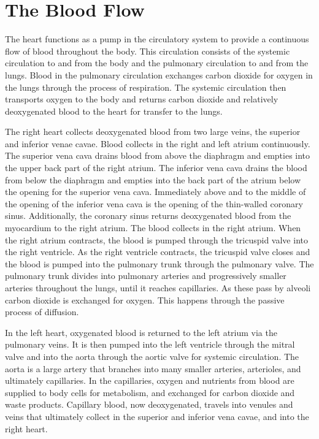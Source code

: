 \hypertarget{the-blood-flow}{%
\section{The Blood Flow}\label{the-blood-flow}}

The heart functions as a pump in the circulatory system to provide a continuous flow of blood throughout the body. This circulation consists of the systemic circulation to and from the body and the pulmonary circulation to and from the lungs. Blood in the pulmonary circulation exchanges carbon dioxide for oxygen in the lungs through the process of respiration. The systemic circulation then transports oxygen to the body and returns carbon dioxide and relatively deoxygenated blood to the heart for transfer to the lungs.

The right heart collects deoxygenated blood from two large veins, the superior and inferior venae cavae. Blood collects in the right and left atrium continuously. The superior vena cava drains blood from above the diaphragm and empties into the upper back part of the right atrium. The inferior vena cava drains the blood from below the diaphragm and empties into the back part of the atrium below the opening for the superior vena cava. Immediately above and to the middle of the opening of the inferior vena cava is the opening of the thin-walled coronary sinus. Additionally, the coronary sinus returns deoxygenated blood from the myocardium to the right atrium. The blood collects in the right atrium. When the right atrium contracts, the blood is pumped through the tricuspid valve into the right ventricle. As the right ventricle contracts, the tricuspid valve closes and the blood is pumped into the pulmonary trunk through the pulmonary valve. The pulmonary trunk divides into pulmonary arteries and progressively smaller arteries throughout the lungs, until it reaches capillaries. As these pass by alveoli carbon dioxide is exchanged for oxygen. This happens through the passive process of diffusion.

In the left heart, oxygenated blood is returned to the left atrium via the pulmonary veins. It is then pumped into the left ventricle through the mitral valve and into the aorta through the aortic valve for systemic circulation. The aorta is a large artery that branches into many smaller arteries, arterioles, and ultimately capillaries. In the capillaries, oxygen and nutrients from blood are supplied to body cells for metabolism, and exchanged for carbon dioxide and waste products. Capillary blood, now deoxygenated, travels into venules and veins that ultimately collect in the superior and inferior vena cavae, and into the right heart.

